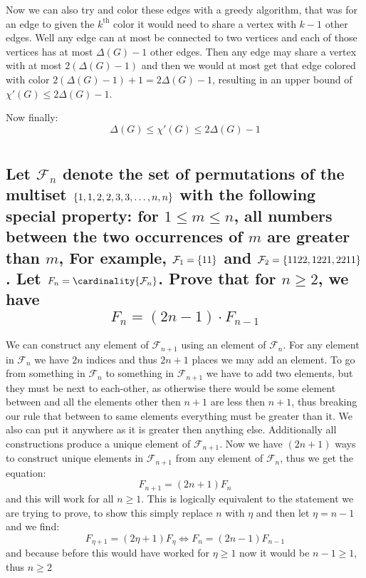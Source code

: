 \documentclass{article}
\theoremstyle{definition}
\begin{document}
	Now we can also try and color these edges with a greedy algorithm, that was for an edge to given the $k^{\text{th}}$ color it would need to share a vertex with $k-1$ other edges. Well any edge can at most be connected to two vertices and each of those vertices has at most $\Delta(G) - 1$ other edges. Then any edge may share a vertex with at most $2(\Delta(G) - 1)$ and then we would at most get that edge colored with color $2(\Delta(G) -1) + 1 = 2\Delta(G) - 1$, resulting in an upper bound of $\chi'(G) \le 2\Delta(G) - 1$.
	
	Now finally: $$\Delta(G) \le \chi'(G) \le 2\Delta(G) -1$$
	
	\section{}
	\subsection{Let $\mathcal F_n$ denote the set of permutations of the multiset $\left\{ {1,1,2,2,3,3,\ldots,n,n} \right\}$ with the following special property: for $1 \le m \le n$, all numbers between the two occurrences of $m$ are greater than $m$, For example, $\mathcal F_1 = \left\{ {11} \right\}$ and $\mathcal F_2 = \left\{ {1122,1221,2211} \right\}$. Let $F_n = \cardinality{\mathcal F_n}$. Prove that for $n\ge 2$, we have $$F_n = (2n-1)\cdot F_{n-1}$$}
	
	We can construct any element of $\mathcal F_{n+1}$ using an element of $\mathcal F_{n}$. For any element in $\mathcal F_n$ we have $2n$ indices and thus $2n+1$ places we may add an element. To go from something in $\mathcal F_n$ to something in $\mathcal F_{n+1}$ we have to add two elements, but they must be next to each-other, as otherwise there would be some element between and all the elements other then $n+1$ are less then $n+1$, thus breaking our rule that between to same elements everything must be greater than it. We also can put it anywhere as it is greater then anything else. Additionally all constructions produce a unique element of $\mathcal F_{n+1}$. Now we have $(2n+1)$ ways to construct unique elements in $\mathcal F_{n+1}$ from any element of $\mathcal F_{n}$, thus we get the equation: $$F_{n+1} = (2n+1)F_n$$ and this will work for all $n\ge 1$. This is logically equivalent to the statement we are trying to prove, to show this simply replace $n$ with $\eta$ and then let $\eta = n-1$ and we find: $$F_{\eta + 1} = (2\eta + 1)F_\eta \iff F_{n} = (2n-1)F_{n-1}$$ and because before this would have worked for $\eta \ge 1$ now it would be $n-1 \ge 1$, thus $n\ge 2$
	
\end{document}
